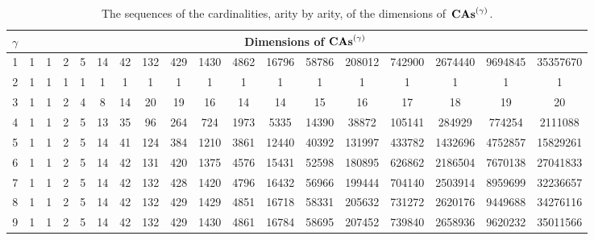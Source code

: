 \begin{table}[ht]
    \centering
    \footnotesize
    \setlength{\tabcolsep}{.35em}
    \begin{tabular}{c||ccccccccccccccccc}
        $\gamma$ & \multicolumn{17}{c}{Dimensions of $\mathbf{CAs}^{\left(\gamma\right)}$}
        \\ \hline \hline
        1 & 1 & 1 & 2 & 5 & 14 & 42 & 132 & 429 & 1430 & 4862
        & 16796 & 58786 & 208012 & 742900 & 2674440 & 9694845
        & 35357670
        \\
        2 & 1 & 1 & 1 & 1 & 1 & 1 & 1 & 1 & 1 & 1 & 1 & 1 & 1 & 1 & 1
        & 1 & 1
        \\
        3 & 1 & 1 & 2 & 4 & 8 & 14 & 20 & 19 & 16 & 14 &
        14 & 15 & 16 & 17 & 18 & 19 & 20
        \\
        4 & 1 & 1 & 2 & 5 & 13 & 35 & 96 & 264 & 724 & 1973 & 5335
        & 14390 & 38872 & 105141 & 284929 & 774254 & 2111088
        \\
        5 & 1 & 1 & 2 & 5 & 14 & 41 & 124 & 384 & 1210 & 3861 & 12440
        & 40392 & 131997 & 433782 & 1432696 & 4752857
        & 15829261
        \\
        6 & 1 & 1 & 2 & 5 & 14 & 42 & 131 & 420 & 1375 & 4576 & 15431
        & 52598 & 180895 & 626862 & 2186504 & 7670138
        & 27041833
        \\
        7 & 1 & 1 & 2 & 5 & 14 & 42 & 132 & 428 & 1420 & 4796 & 16432
        & 56966 & 199444 & 704140 & 2503914 & 8959699
        & 32236657
        \\
        8 & 1 & 1 & 2 & 5 & 14 & 42 & 132 & 429 & 1429 & 4851 & 16718
        & 58331 & 205632 & 731272 & 2620176 & 9449688 & 34276116
        \\
        9 & 1 & 1 & 2 & 5 & 14 & 42 & 132 & 429 & 1430 & 4861 & 16784
        & 58695 & 207452 & 739840 & 2658936 & 9620232 & 35011566
    \end{tabular}
    \medbreak

    \caption{\footnotesize
    The sequences of the cardinalities, arity by arity, of the
    dimensions of~$\mathbf{CAs}^{\left(\gamma\right)}$.}
    \label{tab:dimensions_CAs}
\end{table}
\medbreak


